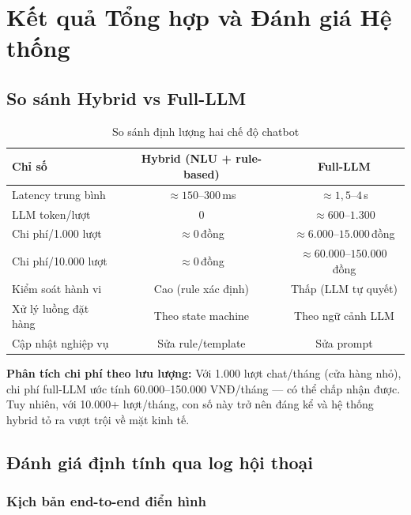 \documentclass[12pt, a4paper]{report}
\begin{document}
\chapter{Kết quả Tổng hợp và Đánh giá Hệ thống}

\section{So sánh Hybrid vs Full-LLM}

\begin{table}[H]
\centering
\caption{So sánh định lượng hai chế độ chatbot}
\label{tab:compare_modes}
\begin{tabular}{lcc}
\toprule
\textbf{Chỉ số} & \textbf{Hybrid (NLU + rule-based)} & \textbf{Full-LLM} \\
\midrule
Latency trung bình     & $\approx 150$--$300$\,ms & $\approx 1{,}5$--$4$\,s \\
LLM token/lượt         & 0                        & $\approx 600$--$1.300$ \\
Chi phí/1.000 lượt     & $\approx 0$\,đồng        & $\approx 6.000$--$15.000$\,đồng \\
Chi phí/10.000 lượt    & $\approx 0$\,đồng        & $\approx 60.000$--$150.000$\,đồng \\
Kiểm soát hành vi      & Cao (rule xác định)      & Thấp (LLM tự quyết) \\
Xử lý luồng đặt hàng  & Theo state machine       & Theo ngữ cảnh LLM \\
Cập nhật nghiệp vụ     & Sửa rule/template        & Sửa prompt \\
\bottomrule
\end{tabular}
\end{table}

\textbf{Phân tích chi phí theo lưu lượng:}
Với 1.000 lượt chat/tháng (cửa hàng nhỏ), chi phí full-LLM
ước tính 60.000--150.000 VNĐ/tháng — có thể chấp nhận được.
Tuy nhiên, với 10.000+ lượt/tháng, con số này trở nên đáng kể
và hệ thống hybrid tỏ ra vượt trội về mặt kinh tế.

\section{Đánh giá định tính qua log hội thoại}

\subsection{Kịch bản end-to-end điển hình}
\end{document}
